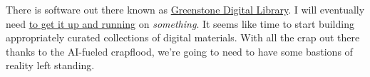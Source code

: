There is software out there known as
\href{https://greenstone.org}{Greenstone Digital Library}. I will
eventually need \href{https://greenstone.org/download}{to get it up and
running} on \emph{something}. It seems like time to start building
appropriately curated collections of digital materials. With all the
crap out there thanks to the AI-fueled crapflood, we're going to need to
have some bastions of reality left standing.
